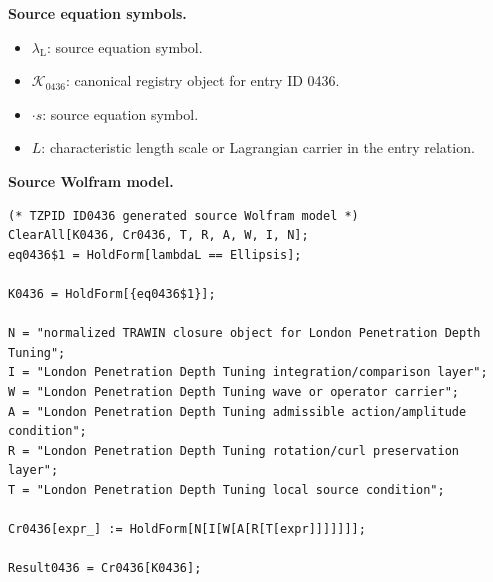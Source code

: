 \begin{minipage}[t]{0.49\linewidth}
\begingroup
\small
\raggedright
\textbf{Source equation symbols.}\par
\begin{itemize}[leftmargin=1.35em,itemsep=1pt,topsep=1pt,parsep=0pt]
    \item $\lambda_{\mathrm{L}}$: source equation symbol.
    \item $\mathcal{K}_{0436}$: canonical registry object for entry ID 0436.
    \item $\cdot s$: source equation symbol.
    \item $L$: characteristic length scale or Lagrangian carrier in the entry relation.
\end{itemize}
\endgroup
\end{minipage}\hfill
\begin{minipage}[t]{0.47\linewidth}
\begingroup
\scriptsize
\raggedright
\textbf{Source Wolfram model.}\par
\begin{Verbatim}[fontsize=\tiny,breaklines=true,breakanywhere=true]
(* TZPID ID0436 generated source Wolfram model *)
ClearAll[K0436, Cr0436, T, R, A, W, I, N];
eq0436$1 = HoldForm[lambdaL == Ellipsis];

K0436 = HoldForm[{eq0436$1}];

N = "normalized TRAWIN closure object for London Penetration Depth Tuning";
I = "London Penetration Depth Tuning integration/comparison layer";
W = "London Penetration Depth Tuning wave or operator carrier";
A = "London Penetration Depth Tuning admissible action/amplitude condition";
R = "London Penetration Depth Tuning rotation/curl preservation layer";
T = "London Penetration Depth Tuning local source condition";

Cr0436[expr_] := HoldForm[N[I[W[A[R[T[expr]]]]]]];

Result0436 = Cr0436[K0436];
\end{Verbatim}
\endgroup
\end{minipage}

